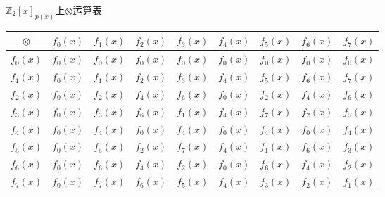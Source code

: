 \begin{Solution}
        \centering
        \makeatletter{}\makeatother\caption{$\mathbb{Z}_2[x]_{p(x)}$上$\otimes$运算表}
        \begin{tabular}{|c|c|c|c|c|c|c|c|c|}
        \hline
        $\otimes$  & $f_0(x)$  & $f_1(x)$  & $f_2(x)$ &  $f_3(x)$ &  $f_4(x)$ &  $f_5(x)$ &  $f_6(x)$ &  $f_7(x)$\\ \hline
        $f_0(x)$  & $f_0(x)$  & $f_0(x)$  & $f_0(x)$ &  $f_0(x)$ &  $f_0(x)$ &  $f_0(x)$ &  $f_0(x)$ &  $f_0(x)$\\ \hline
        $f_1(x)$  & $f_0(x)$  & $f_1(x)$  & $f_2(x)$ &  $f_3(x)$ &  $f_4(x)$ &  $f_5(x)$ &  $f_6(x)$ &  $f_7(x)$\\ \hline
        $f_2(x)$  & $f_0(x)$  & $f_2(x)$  & $f_4(x)$ &  $f_6(x)$ &  $f_0(x)$ &  $f_2(x)$ &  $f_4(x)$ &  $f_6(x)$\\ \hline
        $f_3(x)$  & $f_0(x)$  & $f_3(x)$  & $f_6(x)$ &  $f_1(x)$ &  $f_4(x)$ &  $f_7(x)$ &  $f_2(x)$ &  $f_5(x)$\\ \hline
        $f_4(x)$  & $f_0(x)$  & $f_4(x)$  & $f_0(x)$ &  $f_4(x)$ &  $f_0(x)$ &  $f_4(x)$ &  $f_0(x)$ &  $f_4(x)$\\ \hline
        $f_5(x)$  & $f_0(x)$  & $f_5(x)$  & $f_2(x)$ &  $f_7(x)$ &  $f_4(x)$ &  $f_1(x)$ &  $f_6(x)$ &  $f_3(x)$\\ \hline
        $f_6(x)$  & $f_0(x)$  & $f_6(x)$  & $f_4(x)$ &  $f_2(x)$ &  $f_0(x)$ &  $f_6(x)$ &  $f_4(x)$ &  $f_2(x)$\\ \hline
        $f_7(x)$  & $f_0(x)$  & $f_7(x)$  & $f_6(x)$ &  $f_5(x)$ &  $f_4(x)$ &  $f_3(x)$ &  $f_2(x)$ &  $f_1(x)$\\ \hline
        \end{tabular}
\\
\end{Solution}
